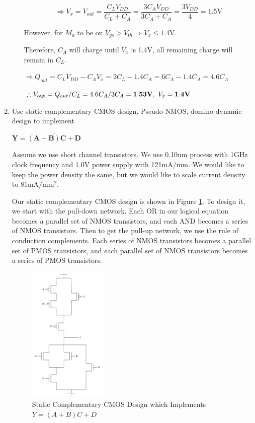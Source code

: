 \documentclass[fleqn]{article}
\begin{document}
\begin{enumerate}
\begin{enumerate}
			\begin{equation*}
				\Rightarrow V_x = V_{out} = \frac{C_LV_{DD}}{C_L + C_A} = \frac{3C_AV_{DD}}{3C_A + C_A} = \frac{3V_{DD}}{4} = 1.5\text{V}
			\end{equation*}
			
			 However, for $M_a$ to be on $V_{gs} > V_{th} \Rightarrow V_x \leq 1.4\text{V}$.
			
			Therefore, $C_A$ will charge until $V_x$ is 1.4V, all remaining charge will remain in $C_L$.
			
			$\Rightarrow Q_{out} = C_LV_{DD} - C_AV_x = 2C_L - 1.4C_A = 6C_A - 1.4C_A = 4.6C_A$
			
			$\therefore V_\text{out} = Q_{out}/C_L = 4.6C_A/3C_A = \mathbf{1.53\text{\textbf{V}}},\ V_x = \mathbf{1.4\text{\textbf{V}}}$
			
			\end{enumerate}
		
		\item Use static complementary CMOS design, Pseudo-NMOS, domino dynamic design to implement
		
		$\mathbf{Y = \overline{(A + B)C + D}}$
		
		Assume we use short channel transistors. We use 0.10um process with 1GHz clock frequency and 1.0V power supply with 121mA/mm. We would like to keep the power density the same, but we would like to scale current density to $81\text{mA}/\text{mm}^2$.
		
		Our static complementary CMOS design is shown in Figure \ref{fig::problem2_static_cmos}. To design it, we start with the pull-down network. Each OR in our logical equation becomes a parallel set of NMOS transistors, and each AND becomes a series of NMOS transistors. Then to get the pull-up network, we use the rule of conduction complements. Each series of NMOS transistors becomes a parallel set of PMOS transistors, and each parallel set of NMOS transistors becomes a series of PMOS transistors.
		 
		\begin{figure}[H]
			\centerline{\includegraphics[width=0.35\textwidth]{problem2_static_cmos.png}}
			\caption{Static Complementary CMOS Design which Implements $Y = \overline{(A + B)C + D}$}
			\label{fig::problem2_static_cmos}
		\end{figure}


\end{enumerate}
\end{document}

